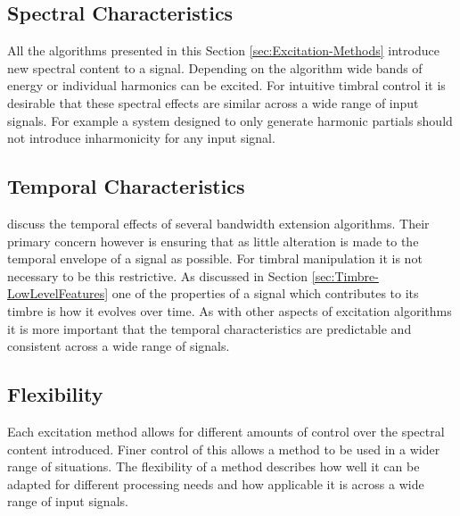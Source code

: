 	\subsection{Spectral Characteristics}
	\label{sec:ExcitationEvaluation-Evaluation-SpectralCharacteristics}
		All the algorithms presented in this Section \ref{sec:Excitation-Methods} introduce new spectral content to
		a signal. Depending on the algorithm wide bands of energy or individual harmonics can be excited. For
		intuitive timbral control it is desirable that these spectral effects are similar across a wide range of
		input signals. For example a system designed to only generate harmonic partials should not introduce
		inharmonicity for any input signal.

	\subsection{Temporal Characteristics}
	\label{sec:ExcitationEvaluation-Evaluation-TemporalCharacteristics}
		\citet{larsen2004audio} discuss the temporal effects of several bandwidth extension algorithms. Their
		primary concern however is ensuring that as little alteration is made to the temporal envelope of a signal
		as possible. For timbral manipulation it is not necessary to be this restrictive. As discussed in Section
		\ref{sec:Timbre-LowLevelFeatures} one of the properties of a signal which contributes to its timbre is how
		it evolves over time. As with other aspects of excitation algorithms it is more important that the temporal
		characteristics are predictable and consistent across a wide range of signals.

	\subsection{Flexibility}
	\label{sec:ExcitationEvaluation-Evaluation-Flexibility}
		Each excitation method allows for different amounts of control over the spectral content introduced. Finer
		control of this allows a method to be used in a wider range of situations. The flexibility of a method
		describes how well it can be adapted for different processing needs and how applicable it is across a wide
		range of input signals.

